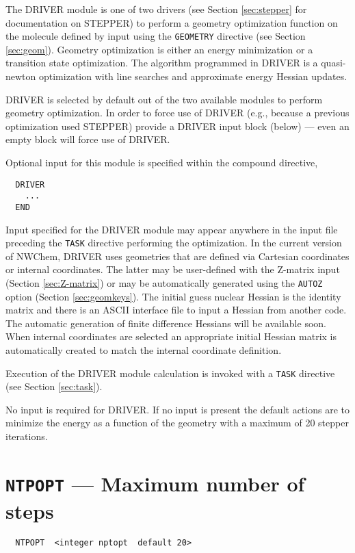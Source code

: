 \label{sec:driver}

The DRIVER module is one of two drivers (see Section \ref{sec:stepper}
for documentation on STEPPER) to perform a geometry optimization
function on the molecule defined by input using the \verb+GEOMETRY+
directive (see Section \ref{sec:geom}).  Geometry optimization is
either an energy minimization or a transition state optimization.
The algorithm programmed in DRIVER is a quasi-newton optimization
with line searches and approximate energy Hessian updates.

DRIVER is selected by default out of the two available modules to
perform geometry optimization.  In order to force use of DRIVER (e.g.,
because a previous optimization used STEPPER) provide a DRIVER input
block (below) --- even an empty block will force use of DRIVER.

Optional input for this module is specified within the compound
directive,
\begin{verbatim}
  DRIVER 
    ...
  END
\end{verbatim}

Input specified for the DRIVER module may appear anywhere in the input
file preceding the \verb+TASK+ directive performing the optimization.
In the current version of NWChem, DRIVER uses geometries that are
defined via Cartesian coordinates or internal coordinates. The latter
may be user-defined with the Z-matrix input (Section
\ref{sec:Z-matrix}) or may be automatically generated using the
\verb+AUTOZ+ option (Section \ref{sec:geomkeys}).  The initial guess
nuclear Hessian is the identity matrix and there is an ASCII interface
file to input a Hessian from another code.  The automatic generation
of finite difference Hessians will be available soon. When internal
coordinates are selected an appropriate initial Hessian matrix is
automatically created to match the internal coordinate definition.

Execution of the DRIVER module calculation is invoked with a
\verb+TASK+ directive (see Section \ref{sec:task}).

No input is required for DRIVER.  If no input is present the default
actions are to minimize the energy as a function of the geometry with a
maximum of 20 stepper iterations.

\section{{\tt NTPOPT} --- Maximum number of steps}

\begin{verbatim}
  NTPOPT  <integer nptopt  default 20>
\end{verbatim}

